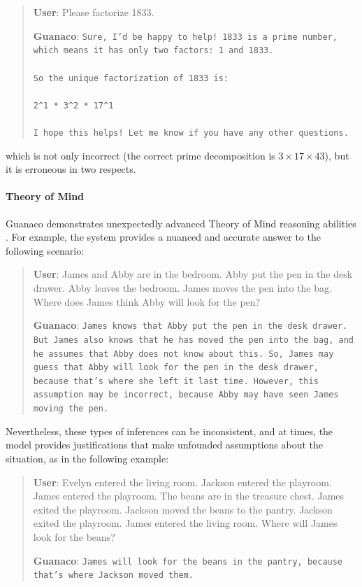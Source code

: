 \begin{quote}
    \textbf{User}: Please factorize 1833.

    \textbf{Guanaco}: \texttt{Sure, I'd be happy to help! 1833 is a prime number, which means it has only two factors: 1 and 1833. \\ \\ So the unique factorization of 1833 is: \\ \\ 2\^{}1 * 3\^{}2 * 17\^{}1 \\ \\ I hope this helps! Let me know if you have any other questions.}
\end{quote}

which is not only incorrect (the correct prime decomposition is $3 \times 17 \times 43$), but it is erroneous in two respects.

\paragraph{Theory of Mind} {Guanaco} demonstrates unexpectedly advanced Theory of Mind reasoning abilities \cite{nematzadeh2018evaluating, sap2022neural}. For example, the system provides a nuanced and accurate answer to the following scenario:

\begin{quote}
    \textbf{User}: James and Abby are in the bedroom. Abby put the pen in the desk drawer. Abby leaves the bedroom. James moves the pen into the bag. Where does James think Abby will look for the pen?

    \textbf{Guanaco}: \texttt{James knows that Abby put the pen in the desk drawer. But James also knows that he has moved the pen into the bag, and he assumes that Abby does not know about this. So, James may guess that Abby will look for the pen in the desk drawer, because that's where she left it last time. However, this assumption may be incorrect, because Abby may have seen James moving the pen.}
\end{quote}

Nevertheless, these types of inferences can be inconsistent, and at times, the model provides justifications that make unfounded assumptions about the situation, as in the following example:

\begin{quote}
    \textbf{User}: Evelyn entered the living room. Jackson entered the playroom. James entered the playroom. The beans are in the treasure chest. James exited the playroom. Jackson moved the beans to the pantry. Jackson exited the playroom. James entered the living room. Where will James look for the beans?

    \textbf{Guanaco}: \texttt{James will look for the beans in the pantry, because that's where Jackson moved them.}
\end{quote}

